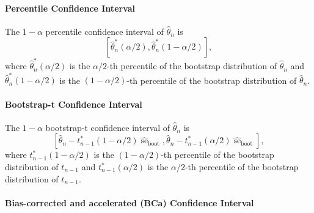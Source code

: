 \paragraph{Percentile Confidence Interval}

The $1-\alpha$ percentile confidence interval of $\hat{\theta}_{n}$ is
\begin{equation}
	\left[\hat{\theta}_{n}^{*}\left(\alpha/2\right),\hat{\theta}_{n}^{*}\left(1-\alpha/2\right)\right],
\end{equation}
where $\hat{\theta}_{n}^{*}\left(\alpha/2\right)$ is the $\alpha/2$-th percentile of the bootstrap distribution of $\hat{\theta}_{n}$ and $\hat{\theta}_{n}^{*}\left(1-\alpha/2\right)$ is the $\left(1-\alpha/2\right)$-th percentile of the bootstrap distribution of $\hat{\theta}_{n}$.

\paragraph{Bootstrap-t Confidence Interval}

The $1-\alpha$ bootstrap-t confidence interval of $\hat{\theta}_{n}$ is
\begin{equation}
	\left[\hat{\theta}_{n}-t_{n-1}^{*}\left(1-\alpha/2\right)\widehat{\operatorname{se}}_{\text{boot}},\hat{\theta}_{n}-t_{n-1}^{*}\left(\alpha/2\right)\widehat{\operatorname{se}}_{\text{boot}}\right],
\end{equation}
where $t_{n-1}^{*}\left(1-\alpha/2\right)$ is the $\left(1-\alpha/2\right)$-th percentile of the bootstrap distribution of $t_{n-1}$ and $t_{n-1}^{*}\left(\alpha/2\right)$ is the $\alpha/2$-th percentile of the bootstrap distribution of $t_{n-1}$.

\paragraph{Bias-corrected and accelerated (BCa) Confidence Interval}

